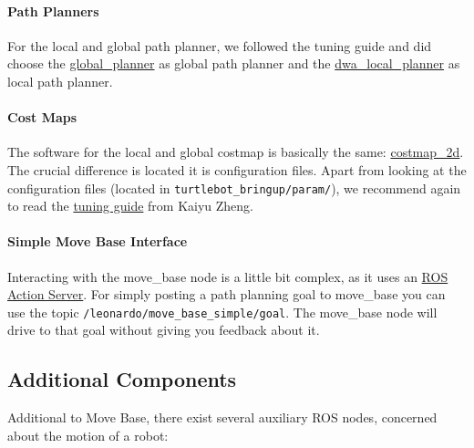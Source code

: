 \paragraph{Path Planners}

For the local and global path planner, we followed the tuning guide and did choose the \href{http://wiki.ros.org/global_planner}{global\_planner} as global path planner and the \href{http://wiki.ros.org/dwa_local_planner}{dwa\_local\_planner} as local path planner. 

\paragraph{Cost Maps}

The software for the local and global costmap is basically the same: \href{http://wiki.ros.org/costmap_2d}{costmap\_2d}. The crucial difference is located it is configuration files. Apart from looking at the configuration files (located in \verb$turtlebot_bringup/param/$), we recommend again to read the \href{http://kaiyuzheng.me/documents/navguide.pdf}{tuning guide} from Kaiyu Zheng.

\paragraph{Simple Move Base Interface}

Interacting with the move\_base node is a little bit complex, as it uses an \href{http://wiki.ros.org/actionlib/Tutorials}{ROS Action Server}. For simply posting a path planning goal to move\_base you can use the topic \verb$/leonardo/move_base_simple/goal$. The move\_base node will drive to that goal without giving you feedback about it. 

\subsection{Additional Components}
\label{ssec:AddComponents}

Additional to Move Base, there exist several auxiliary ROS nodes, concerned about the motion of a robot:

